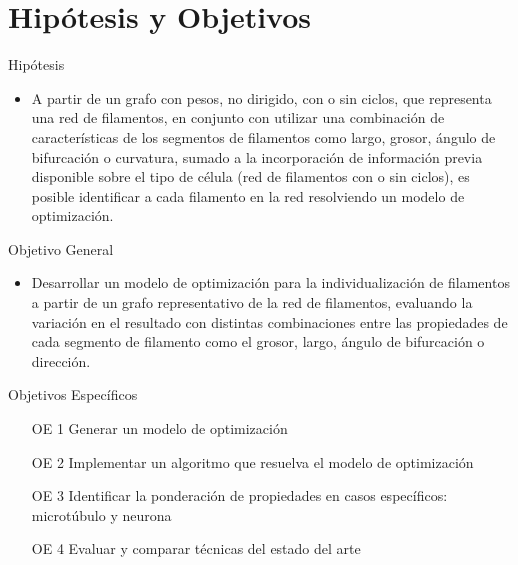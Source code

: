 \documentclass[]{beamer}
\begin{document}
\section{Hip\'otesis y Objetivos}
\begin{frame}{Hip\'otesis}
\small
    \begin{itemize}
        \item A partir de un grafo con pesos, no dirigido, con o sin ciclos, que representa una red de filamentos, en conjunto con utilizar una combinaci\'on de caracter\'isticas de los segmentos de filamentos como largo, grosor, \'angulo de bifurcaci\'on o curvatura, sumado a la incorporaci\'on de informaci\'on previa disponible sobre el tipo de c\'elula (red de filamentos con o sin ciclos), es posible identificar a cada filamento en la red resolviendo un modelo de optimizaci\'on.
    \end{itemize}
\end{frame}

\begin{frame}{Objetivo General}
\small
    \begin{itemize}
        \item Desarrollar un modelo de optimizaci\'on para la individualizaci\'on de filamentos a partir de un grafo representativo de la red de filamentos, evaluando la variaci\'on en el resultado con distintas combinaciones entre las propiedades de cada segmento de filamento como el grosor, largo, \'angulo de bifurcaci\'on o direcci\'on.
    \end{itemize}
\end{frame}


\begin{frame}{Objetivos Espec\'ificos}
\small
\begin{enumerate}
    \item[OE 1] Generar un modelo de optimizaci\'on %
    \item[OE 2] Implementar un algoritmo que resuelva el modelo de optimizaci\'on %
    \item[OE 3] Identificar la ponderaci\'on de propiedades en casos espec\'ificos: microt\'ubulo y neurona %
    \item[OE 4] Evaluar y comparar t\'ecnicas del estado del arte%
\end{enumerate}
    
\end{frame}
\end{document}
